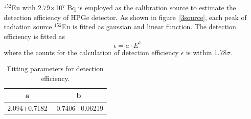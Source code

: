 $^{152}$Eu with 2.79$\times$10$^7$ Bq is employed as the calibration source to estimate the detection efficiency of HPGe detector.
As shown in figure~\ref{3source}, each peak of radiation source $^{152}$Eu is fitted as gaussian and linear function.
The detection efficiency is fitted as
\begin{equation}
 \epsilon = a \cdot E^b
\end{equation}
where the counts for the calculation of detection efficiency $\epsilon$ is within 1.78$\sigma$.
\begin{table}[H]
 \centering
 \begin{tabular}{cc} \hline \hline
  a & b \\ \hline
  2.094$\pm$0.7182 & -0.7406$\pm$0.06219 \\ \hline \hline
 \end{tabular}
 \caption{Fitting parameters for detection efficiency.}
\end{table}


